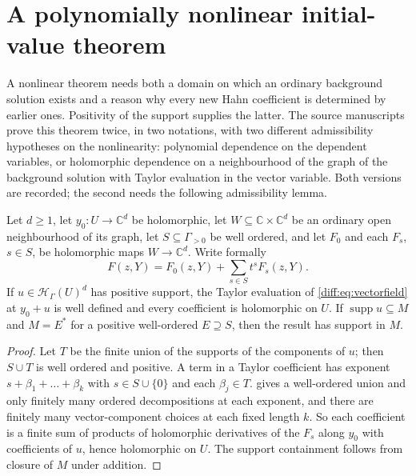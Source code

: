 \documentclass[11pt,letterpaper]{article}
\numberwithin{equation}{section}
\theoremstyle{definition}
\theoremstyle{remark}
\newcommand{\C}{\mathbb C}
\newcommand{\supp}{\operatorname{supp}}
\newcommand{\Hring}{\mathscr H}
\begin{document}
\section{A polynomially nonlinear initial-value theorem}
\label{diff:sec:coherentnonlinear}

A nonlinear theorem needs both a domain on which an ordinary background
solution exists and a reason why every new Hahn coefficient is determined by
earlier ones. Positivity of the support supplies the latter. The source
manuscripts prove this theorem twice, in two notations, with two different
admissibility hypotheses on the nonlinearity: polynomial dependence on the
dependent variables, or holomorphic dependence on a neighbourhood of the graph
of the background solution with Taylor evaluation in the vector variable. Both
versions are recorded; the second needs the following admissibility lemma.

\begin{lemma}
\label{diff:lem:nonlinear}
Let $d\geq1$, let $y_{0}:U\to\C^{d}$ be holomorphic, let
$W\subseteq\C\times\C^{d}$ be an ordinary open neighbourhood of its graph, let
$S\subseteq\Gamma_{>0}$ be well ordered, and let $F_{0}$ and each $F_{s}$,
$s\in S$, be holomorphic maps $W\to\C^{d}$. Write formally
\begin{equation}\label{diff:eq:vectorfield}
 F(z,Y)=F_{0}(z,Y)+\sum_{s\in S}t^{s}F_{s}(z,Y).
\end{equation}
If $u\in\Hring_{\Gamma}(U)^{d}$ has positive support, the Taylor evaluation of
\cref{diff:eq:vectorfield} at $y_{0}+u$ is well defined and every coefficient
is holomorphic on $U$. If $\supp u\subseteq M$ and $M=E^{*}$ for a positive
well-ordered $E\supseteq S$, then the result has support in $M$.
\end{lemma}
\begin{proof}
Let $T$ be the finite union of the supports of the components of $u$; then
$S\cup T$ is well ordered and positive. A term in a Taylor coefficient has
exponent $s+\beta_{1}+\dots+\beta_{k}$ with $s\in S\cup\{0\}$ and each
$\beta_{j}\in T$.  gives a well-ordered union and only
finitely many ordered decompositions at each exponent, and there are finitely
many vector-component choices at each fixed length $k$. So each coefficient is
a finite sum of products of holomorphic derivatives of the $F_{s}$ along
$y_{0}$ with coefficients of $u$, hence holomorphic on $U$. The support
containment follows from closure of $M$ under addition.
\end{proof}
\end{document}
